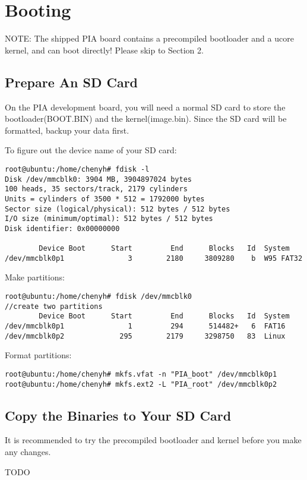 \documentclass[a4paper]{article}
\begin{document}
\section{Booting}
NOTE: The shipped PIA board contains a precompiled bootloader and a 
ucore kernel, and can boot directly! Please skip to Section 2.
\subsection{Prepare An SD Card}

On the PIA development board, you will need a normal SD card to store
the bootloader(BOOT.BIN) and the kernel(image.bin).
Since the SD card will be formatted, backup your data first.

To figure out the device name of your SD card:
\begin{verbatim}
root@ubuntu:/home/chenyh# fdisk -l
Disk /dev/mmcblk0: 3904 MB, 3904897024 bytes
100 heads, 35 sectors/track, 2179 cylinders
Units = cylinders of 3500 * 512 = 1792000 bytes
Sector size (logical/physical): 512 bytes / 512 bytes
I/O size (minimum/optimal): 512 bytes / 512 bytes
Disk identifier: 0x00000000

        Device Boot      Start         End      Blocks   Id  System
/dev/mmcblk0p1               3        2180     3809280    b  W95 FAT32
\end{verbatim}

Make partitions:
\begin{verbatim}
root@ubuntu:/home/chenyh# fdisk /dev/mmcblk0
//create two partitions
        Device Boot      Start         End      Blocks   Id  System
/dev/mmcblk0p1               1         294      514482+   6  FAT16
/dev/mmcblk0p2             295        2179     3298750   83  Linux
\end{verbatim}

Format partitions:
\begin{verbatim}
root@ubuntu:/home/chenyh# mkfs.vfat -n "PIA_boot" /dev/mmcblk0p1
root@ubuntu:/home/chenyh# mkfs.ext2 -L "PIA_root" /dev/mmcblk0p2
\end{verbatim}

\subsection{Copy the Binaries to Your SD Card}
It is recommended to try the precompiled bootloader and kernel before
you make any changes.

TODO
\end{document}
